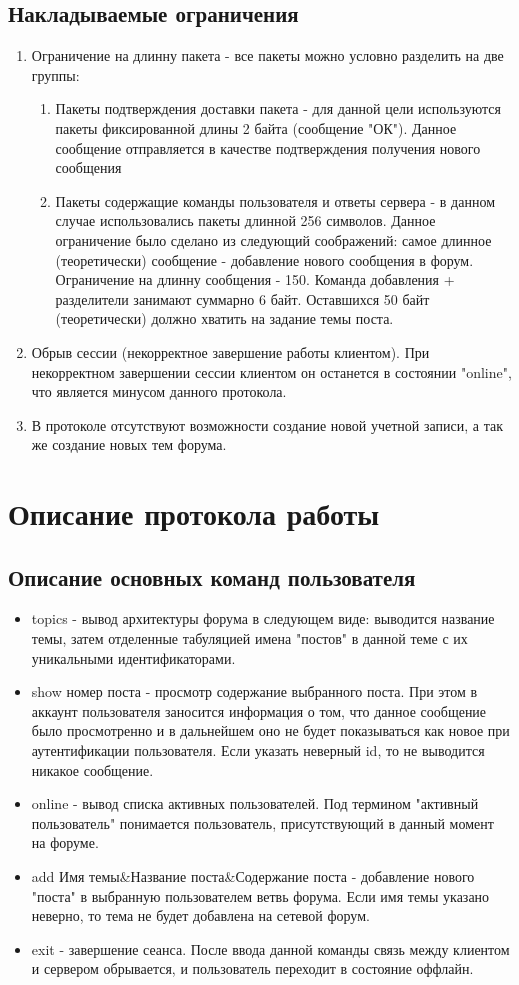 \documentclass[10pt,a4paper]{report}
\begin{document}
\section{Накладываемые ограничения}
\begin{enumerate}
\item Ограничение на длинну пакета - все пакеты можно условно разделить на две группы:
\begin{enumerate}
\item Пакеты подтверждения доставки пакета - для данной цели используются пакеты фиксированной длины 2 байта (сообщение "ОК"). Данное сообщение отправляется в качестве подтверждения получения нового сообщения
\item Пакеты содержащие команды пользователя и ответы сервера - в данном случае использовались пакеты длинной 256 символов. Данное ограничение было сделано из следующий соображений: самое длинное (теоретически) сообщение - добавление нового сообщения в форум. Ограничение на длинну сообщения - 150. Команда добавления + разделители занимают суммарно 6 байт. Оставшихся 50 байт (теоретически) должно хватить на задание темы поста.
\end{enumerate}
\item Обрыв сессии (некорректное завершение работы клиентом). При некорректном завершении сессии клиентом он останется в состоянии "online", что является минусом данного протокола.
\item В протоколе отсутствуют возможности создание новой учетной записи, а так же создание новых тем форума.
\end{enumerate}
\chapter{Описание протокола работы}
\section{Описание основных команд пользователя}
\begin{itemize}
\item topics - вывод архитектуры форума в следующем виде: выводится название темы, затем отделенные табуляцией имена "постов" в данной теме с их уникальными идентификаторами.
\item show номер поста - просмотр содержание выбранного поста. При этом в аккаунт пользователя заносится информация о том, что данное сообщение было просмотренно и в дальнейшем оно не будет показываться как новое при аутентификации пользователя. Если указать неверный id, то не выводится никакое сообщение.
\item online - вывод списка активных пользователей. Под термином "активный пользователь" понимается пользователь, присутствующий в данный момент на форуме.
\item add Имя темы\&Название поста\&Содержание поста - добавление нового "поста" в выбранную пользователем ветвь форума. Если имя темы указано неверно, то тема не будет добавлена на сетевой форум.
\item exit - завершение сеанса. После ввода данной команды связь между клиентом и сервером обрывается, и пользователь переходит в состояние оффлайн.
\end{itemize}
\end{document}
